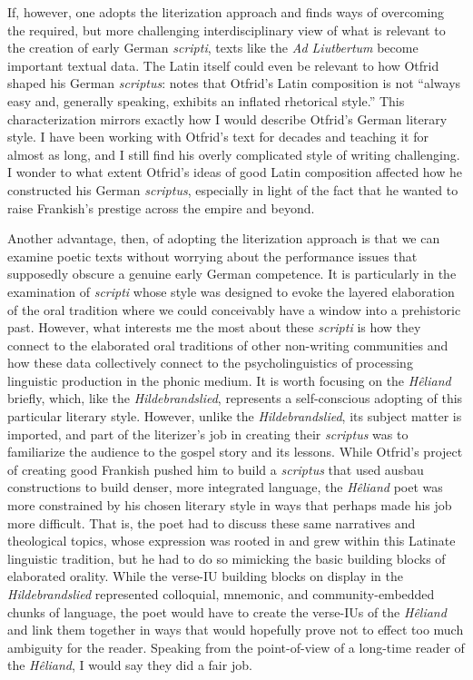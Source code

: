 If, however, one adopts the literization approach and finds ways of overcoming the required, but more challenging interdisciplinary view of what is relevant to the creation of early German \textit{scripti}, texts like the \textit{Ad Liutbertum} become important textual data. The Latin itself could even be relevant to how Otfrid shaped his German \textit{scriptus}: \citet[872]{Magoun1943} notes that Otfrid’s Latin composition is not “always easy and, generally speaking, exhibits an inflated rhetorical style.” This characterization mirrors exactly how I would describe Otfrid’s German literary style. I have been working with Otfrid’s text for decades and teaching it for almost as long, and I still find his overly complicated style of writing challenging. I wonder to what extent Otfrid’s ideas of good Latin composition affected how he constructed his German \textit{scriptus}, especially in light of the fact that he wanted to raise Frankish’s prestige across the empire and beyond.

Another advantage, then, of adopting the literization approach is that we can examine poetic texts without worrying about the performance issues that supposedly obscure a genuine early German competence. It is particularly in the examination of \textit{scripti} whose style was designed to evoke the layered elaboration of the oral tradition where we could conceivably have a window into a prehistoric past. However, what interests me the most about these \textit{scripti} is how they connect to the elaborated oral traditions of other non-writing communities and how these data collectively connect to the psycholinguistics of processing linguistic production in the phonic medium. It is worth focusing on the \textit{Hêliand} briefly, which, like the \textit{Hildebrandslied}, represents a self-conscious adopting of this particular literary style. However, unlike the \textit{Hildebrandslied}, its subject matter is imported, and part of the literizer’s job in creating their \textit{scriptus} was to familiarize the audience to the gospel story and its lessons. While Otfrid’s project of creating good Frankish pushed him to build a \textit{scriptus} that used ausbau constructions to build denser, more integrated language, the \textit{Hêliand} poet was more constrained by his chosen literary style in ways that perhaps made his job more difficult. That is, the poet had to discuss these same narratives and theological topics, whose expression was rooted in and grew within this Latinate linguistic tradition, but he had to do so mimicking the basic building blocks of elaborated orality. While the verse-IU building blocks on display in the \textit{Hildebrandslied} represented colloquial, mnemonic, and community-embedded chunks of language, the poet would have to create the verse-IUs of the \textit{Hêliand} and link them together in ways that would hopefully prove not to effect too much ambiguity for the reader. Speaking from the point-of-view of a long-time reader of the \textit{Hêliand}, I would say they did a fair job.

